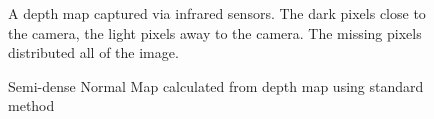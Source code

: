 
\begin{figure}[!h]
	\centering
	\caption{A depth map captured via infrared sensors. The dark pixels close to the camera, the light pixels away to the camera. The missing pixels distributed all of the image.}
	\label{fig:depth_map_with_noise}
\end{figure}


\begin{figure}[!h]
	\centering
	\caption{Semi-dense Normal Map calculated from depth map using standard method}
	\label{fig:standard_normal_inference}
\end{figure}





